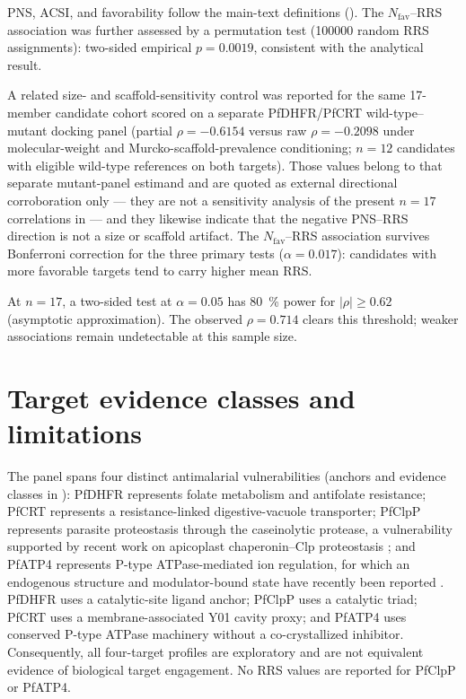 \documentclass[journal=jcisd8,manuscript=suppinfo]{achemso}
\begin{document}
PNS, ACSI, and favorability follow the main-text definitions (). The $N_{\mathrm{fav}}$--RRS association was further assessed by a permutation test (\num{100000} random RRS assignments): two-sided empirical $p=\num{0.0019}$, consistent with the analytical result.

A related size- and scaffold-sensitivity control was reported for the same 17-member candidate cohort scored on a separate PfDHFR/PfCRT wild-type--mutant docking panel (partial $\rho=-\num{0.6154}$ versus raw $\rho=-\num{0.2098}$ under molecular-weight and Murcko-scaffold-prevalence conditioning; $n=\num{12}$ candidates with eligible wild-type references on both targets). Those values belong to that separate mutant-panel estimand and are quoted as external directional corroboration only --- they are not a sensitivity analysis of the present $n=\num{17}$ correlations in  --- and they likewise indicate that the negative PNS--RRS direction is not a size or scaffold artifact. The $N_{\mathrm{fav}}$--RRS association survives Bonferroni correction for the three primary tests ($\alpha=\num{0.017}$): candidates with more favorable targets tend to carry higher mean RRS.

At $n=\num{17}$, a two-sided test at $\alpha=\num{0.05}$ has \qty{80}{\percent} power for $|\rho|\geq\num{0.62}$ (asymptotic approximation). The observed $\rho=\num{0.714}$ clears this threshold; weaker associations remain undetectable at this sample size.



\section{Target evidence classes and limitations}\label{sec:sm_evidence}
The panel spans four distinct antimalarial vulnerabilities (anchors and evidence classes in ): PfDHFR represents folate metabolism and antifolate resistance; PfCRT represents a resistance-linked digestive-vacuole transporter; PfClpP represents parasite proteostasis through the caseinolytic protease, a vulnerability supported by recent work on apicoplast chaperonin--Clp proteostasis \cite{Tissawak2025}; and PfATP4 represents P-type ATPase-mediated ion regulation, for which an endogenous structure and modulator-bound state have recently been reported \cite{Haile2025}. PfDHFR uses a catalytic-site ligand anchor; PfClpP uses a catalytic triad; PfCRT uses a membrane-associated Y01 cavity proxy; and PfATP4 uses conserved P-type ATPase machinery without a co-crystallized inhibitor. Consequently, all four-target profiles are exploratory and are not equivalent evidence of biological target engagement. No RRS values are reported for PfClpP or PfATP4.
\end{document}
